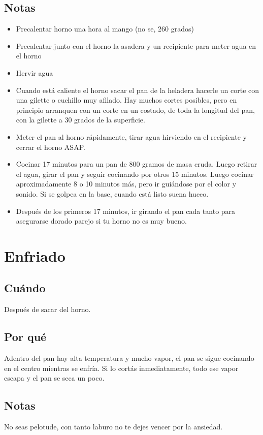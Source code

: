\documentclass[10pt,a4paper]{article}
\begin{document}
\subsection*{Notas}
\begin{itemize}
\item Precalentar horno una hora al mango (no se, 260 grados)
\item Precalentar junto con el horno la asadera y un recipiente para meter
  agua en el horno
\item Hervir agua
\item Cuando está caliente el horno sacar el pan de la heladera hacerle un
  corte con una gilette o cuchillo muy afilado. Hay muchos cortes posibles,
  pero en principio arranquen con un corte en un costado, de toda la
  longitud del pan, con la gilette a 30 grados de la superficie.

\item Meter el pan al horno rápidamente, tirar agua hirviendo en el
  recipiente y cerrar el horno ASAP.
\item Cocinar 17 minutos para un pan de 800 gramos de masa cruda. Luego
  retirar el agua, girar el pan y seguir cocinando por otros 15 minutos.
  Luego cocinar aproximadamente 8 o 10 minutos más, pero ir guiándose por el
  color y sonido. Si se golpea en la base, cuando está listo suena hueco.
\item Después de los primeros 17 minutos, ir girando el pan cada tanto para
  asegurarse dorado parejo si tu horno no es muy bueno.
\end{itemize}

\section{Enfriado}
\subsection*{Cuándo}
Después de sacar del horno.
\subsection*{Por qué}
Adentro del pan hay alta temperatura y mucho vapor, el pan se sigue cocinando en
el centro mientras se enfría. Si lo cortás inmediatamente, todo ese vapor escapa
y el pan se seca un poco.
\subsection*{Notas}
No seas pelotude, con tanto laburo no te dejes vencer por la ansiedad.
\end{document}
